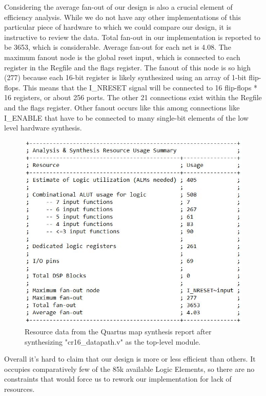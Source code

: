 \documentclass[conference]{IEEEtran}
\begin{document}
Considering the average fan-out of our design is also a crucial element of efficiency analysis. While we do not have any other implementations of this particular piece of hardware to which we could compare our design, it is instructive to review the data. Total fan-out in our implementation is reported to be 3653, which is considerable. Average fan-out for each net is 4.08. The maximum fanout node is the global reset input, which is connected to each register in the Regfile and the flags register. The fanout of this node is so high (277) because each 16-bit register is likely synthesized using an array of 1-bit flip-flops. This means that the I\_NRESET signal will be connected to 16 flip-flops * 16 registers, or about 256 ports. The other 21 connections exist within the Regfile and the flags register. Other fanout occurs like this among connections like I\_ENABLE that have to be connected to many single-bit elements of the low level hardware synthesis.
\begin{figure}[h]
    \centering
    \includegraphics[scale=0.5]{resources/figures/analysis_and_synthesis_resources.JPG}
    \caption{Resource data from the Quartus map synthesis report after synthesizing "cr16\_datapath.v" as the top-level module.}
    \label{fig:datapath_analysis_resources}
\end{figure}
Overall it's hard to claim that our design is more or less efficient than others. It occupies comparatively few of the 85k available Logic Elements, so there are no constraints that would force us to rework our implementation for lack of resources.
\end{document}
